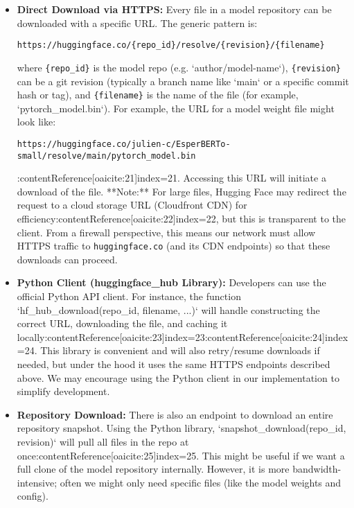 \documentclass{article}
\begin{document}
\begin{itemize}
    \item \textbf{Direct Download via HTTPS:} Every file in a model repository can be downloaded with a specific URL. The generic pattern is: 
    \begin{center}
    \texttt{https://huggingface.co/\{repo\_id\}/resolve/\{revision\}/\{filename\}}
    \end{center}
    where \texttt{\{repo\_id\}} is the model repo (e.g. `author/model-name`), \texttt{\{revision\}} can be a git revision (typically a branch name like `main` or a specific commit hash or tag), and \texttt{\{filename\}} is the name of the file (for example, `pytorch_model.bin`). For example, the URL for a model weight file might look like:
    \begin{center}
    \small\texttt{https://huggingface.co/julien-c/EsperBERTo-small/resolve/main/pytorch\_model.bin}
    \end{center}
    :contentReference[oaicite:21]{index=21}. Accessing this URL will initiate a download of the file. **Note:** For large files, Hugging Face may redirect the request to a cloud storage URL (Cloudfront CDN) for efficiency:contentReference[oaicite:22]{index=22}, but this is transparent to the client. From a firewall perspective, this means our network must allow HTTPS traffic to \texttt{huggingface.co} (and its CDN endpoints) so that these downloads can proceed.
    \item \textbf{Python Client (huggingface\_hub Library):} Developers can use the official Python API client. For instance, the function `hf_hub_download(repo_id, filename, ...)` will handle constructing the correct URL, downloading the file, and caching it locally:contentReference[oaicite:23]{index=23}:contentReference[oaicite:24]{index=24}. This library is convenient and will also retry/resume downloads if needed, but under the hood it uses the same HTTPS endpoints described above. We may encourage using the Python client in our implementation to simplify development.
    \item \textbf{Repository Download:} There is also an endpoint to download an entire repository snapshot. Using the Python library, `snapshot_download(repo_id, revision)` will pull all files in the repo at once:contentReference[oaicite:25]{index=25}. This might be useful if we want a full clone of the model repository internally. However, it is more bandwidth-intensive; often we might only need specific files (like the model weights and config).
\end{itemize}
\end{document}
